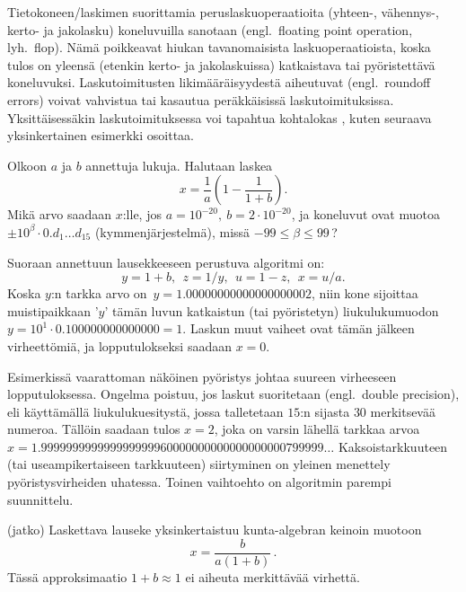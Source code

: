 Tietokoneen/laskimen suorittamia peruslaskuoperaatioita (yhteen-, vähennys-, kerto- ja 
jakolasku) koneluvuilla sanotaan  (engl.\ floating point operation,
lyh.\ flop). Nämä poikkeavat hiukan tavanomaisista laskuoperaatioista, koska tulos on yleensä
(etenkin kerto- ja jakolaskuissa) katkaistava tai pyöristettävä koneluvuksi. Laskutoimitusten
%
likimääräisyydestä aiheutuvat  (engl.\ roundoff errors) voivat vahvistua
tai kasautua peräkkäisissä laskutoimituksissa. Yksittäisessäkin laskutoimituksessa voi tapahtua
kohtalokas
%
, kuten seuraava yksinkertainen esimerkki osoittaa.
\begin{Exa} Olkoon $a$ ja $b$ annettuja lukuja. Halutaan laskea
\[
x=\frac{1}{a}\left(1-\frac{1}{1+b}\right).
\]
Mikä arvo saadaan $x$:lle, jos $a=10^{-20},\ b=2 \cdot 10^{-20}$, ja koneluvut ovat muotoa 
$\pm 10^{\beta} \cdot 0 . d_1 \ldots d_{15}$ (kymmenjärjestelmä), missä $-99 \le \beta \le 99$\,?
\end{Exa}
\ratk Suoraan annettuun lausekkeeseen perustuva algoritmi on:
\[
y=1+b,\ \ z=1/y,\ \ u=1-z,\ \ x=u/a.
\]
Koska $y$:n tarkka arvo on $\,y = 1.00000000000000000002$,
niin kone sijoittaa muistipaikkaan '$y$' tämän luvun katkaistun (tai pyöristetyn)
liukulukumuodon $y = 10^1 \cdot 0.100000000000000 = 1$. Laskun muut vaiheet ovat tämän jälkeen
virheettömiä, ja lopputulokseksi saadaan $x=0$. \loppu

Esimerkissä vaarattoman näköinen pyöristys johtaa suureen virheeseen lopputuloksessa. Ongelma 
poistuu, jos laskut suoritetaan 
%
 (engl.\ double precision), eli käyttämällä liukulukuesitystä, jossa
talletetaan $15$:n sijasta $30$ merkitsevää numeroa. Tällöin saadaan tulos $x=2$, joka on 
varsin lähellä tarkkaa arvoa $x=1.999999999999999999960000000000000000000799999\ldots$
Kaksoistarkkuuteen (tai useampikertaiseen tarkkuuteen) siirtyminen on yleinen menettely
pyöristysvirheiden uhatessa. Toinen vaihtoehto on algoritmin parempi suunnittelu.
\jatko \begin{Exa} (jatko) Laskettava lauseke yksinkertaistuu kunta-algebran keinoin muotoon
\[
x=\frac{b}{a(1+b)}\,.
\]
Tässä approksimaatio $1+b \approx 1$ ei aiheuta merkittävää virhettä. \loppu
\end{Exa}

